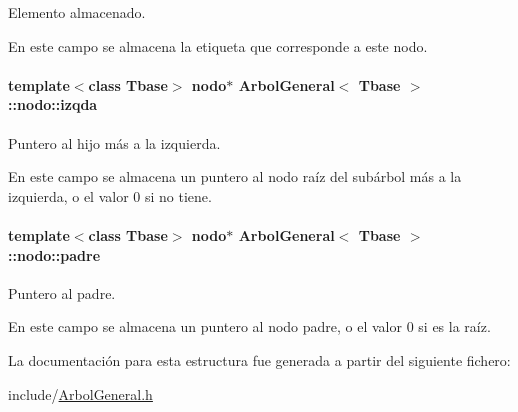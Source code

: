 Elemento almacenado. 

En este campo se almacena la etiqueta que corresponde a este nodo. \hypertarget{structArbolGeneral_1_1nodo_a3b8075b9fd0dc27c2272ba48bd9a9221}{
\paragraph[{izqda}]{\setlength{\rightskip}{0pt plus 5cm}template$<$class Tbase$>$ {\bf nodo}$\ast$ {\bf Arbol\-General}$<$ Tbase $>$\-::nodo\-::izqda}}\label{structArbolGeneral_1_1nodo_a3b8075b9fd0dc27c2272ba48bd9a9221}


Puntero al hijo más a la izquierda. 

En este campo se almacena un puntero al nodo raíz del subárbol más a la izquierda, o el valor 0 si no tiene. \hypertarget{structArbolGeneral_1_1nodo_ab4d70a0179e8450b2842bbf1a6481402}{
\paragraph[{padre}]{\setlength{\rightskip}{0pt plus 5cm}template$<$class Tbase$>$ {\bf nodo}$\ast$ {\bf Arbol\-General}$<$ Tbase $>$\-::nodo\-::padre}}\label{structArbolGeneral_1_1nodo_ab4d70a0179e8450b2842bbf1a6481402}


Puntero al padre. 

En este campo se almacena un puntero al nodo padre, o el valor 0 si es la raíz. 

La documentación para esta estructura fue generada a partir del siguiente fichero\-:\begin{DoxyCompactItemize}
\item 
include/\hyperlink{ArbolGeneral_8h}{Arbol\-General.\-h}\end{DoxyCompactItemize}
